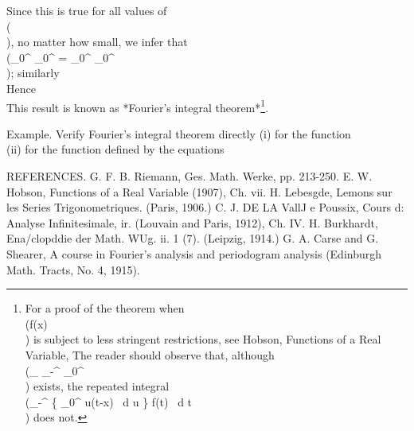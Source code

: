 Since this is true for all values of \\(\eps\\), no matter how small, we infer
that
\\(\int_{0}^{\infty}\!\! \int_{0}^{\lambda} = \int_{0}^{\lambda}\!\! \int_{0}^{\infty}\\);
similarly
\\[ \int_{0}^{-\infty}\!\! \int_{0}^{\lambda} = \int_{0}^{\lambda}\!\! \int_{0}^{-\infty}\\] 

Hence
\\[ \begin{align*}
  \frac{1}{2} \pi \left\{
    f(x+0) + f(x-0)
  \right\}
  & =
  \lim_{\lambda \rightarrow \infty}
  \int_{0}^{\lambda}\!\! \int_{-\infty}^{\infty}
  \cos u(t-x) f(t) \, d t \, d u
  \\
  & =
  \int_{0}^{\infty}\!\! \int_{-\infty}^{\infty}
  \cos u(t-x) f(t) \, d t \, d u.
\end{align*} \\]

This result is known as *Fourier's integral theorem*\footnote{
  For a proof of the theorem when \\(f(x)\\) is subject to less stringent
  restrictions, see
  Hobson, Functions of a Real Variable, %
  The reader should observe that, although
  \\(\lim_{\lambda\rightarrow\infty} \int_{-\infty}^{\infty}\!\! \int_{0}^{\lambda}\\) exists,
  the repeated integral \\(\int_{-\infty}^{\infty}\! \left\{
    \int_{0}^{\infty}\! \sin u(t-x) \, d u
  \right\} f(t) \, d t\\) does not.
}.

Example. %
Verify Fourier's integral theorem directly
(i) %
for the function
\\[ 
f(x) = (a^{2} + x^{2})^{-\frac{1}{2}}
\\] 
(ii) %
for the function defined by the equations
\\[ 
f(x) = 1,
\quad
(-1 < x < 1);
\quad
f(x) = 0,
\quad (\left| \, x \, \right|  > 1).
\\] 

REFERENCES.
G. F. B. Riemann, Ges. Math. Werke, pp. 213-250.
E. W. Hobson, Functions of a Real Variable (1907), Ch. vii.
H. Lebesgde, Lemons sur les Series Trigonometriques. (Paris, 1906.)
C. J. DE LA VallJ e Poussix, Cours d: Analyse Infinitesimale, ir. (Louvain and
Paris, 1912), Ch. IV.
H. Burkhardt, Ena/clopddie der Math. WUg. ii. 1 (7). (Leipzig, 1914.)
G. A. Carse and G. Shearer, A course in Fourier's analysis and
periodogram analysis (Edinburgh Math. Tracts, No. 4, 1915).

